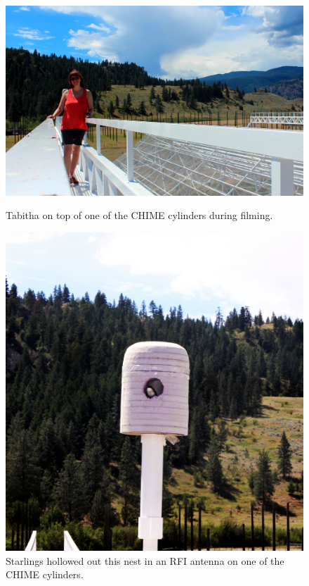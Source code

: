\begin{figure}[htb]
\centering
\begin{minipage}[b]{0.59\textwidth}
\centering
\includegraphics[width=0.95\linewidth]{Planetarium/figures/Filming_at_CHIME.jpg}
\caption{Tabitha on top of one of the CHIME cylinders during filming. }
\label{Fig:CHIME_film}
\end{minipage}%
\begin{minipage}[b]{0.02\textwidth}
\hspace{1cm}
\end{minipage}%
\begin{minipage}[b]{0.37\textwidth}
\centering
\includegraphics[width=0.95\linewidth]{Planetarium/figures/CHIME_birdsnest.jpg}
\caption{Starlings hollowed out this nest in an RFI antenna on one of the CHIME cylinders.}
\label{Fig:CHIME_bird}
\end{minipage}
\end{figure}


